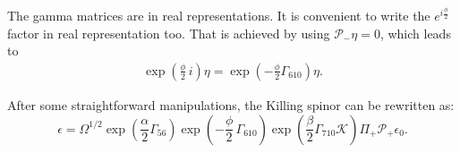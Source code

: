 The gamma matrices are in real representations. It is convenient to write the $e^{i \frac{\phi}{2}}$ factor in real representation too. 
That is achieved by using $\mathcal{P}_- \eta = 0 $, which leads to
\begin{align}
 \exp{\left(\frac{\phi}{2}\, i \right)} \eta 
    = \exp{\left(-\frac{\phi}{2}\Gamma_{6 10} \right)} \eta. 
\end{align}

After some straightforward manipulations, the Killing spinor can be rewritten as:
\begin{equation}\label{eq:KillingSpinor}
\epsilon =  \Omega^{1/2} \exp{\left(\frac{\alpha}{2}\Gamma_{56} \right)} \exp{\left(-\frac{\phi}{2}\, \Gamma_{6 10} \right)} \exp{\left(\frac{\beta}{2}\Gamma_{7 10} \mathcal{K} \right)} \Pi_{+} \mathcal{P}_+ \epsilon_0.
\end{equation}

